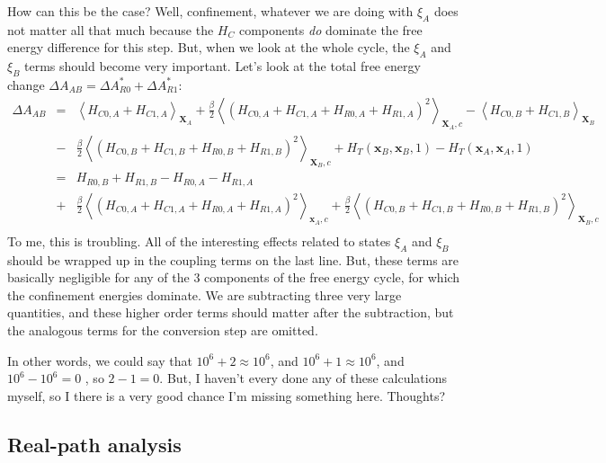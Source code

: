 \documentclass[%
 preprint,
 amsmath,amssymb,
 aps,
]{revtex4-1}
\renewcommand{\vec}[1]{{\mathbf{#1}}}
\begin{document}
 How can this be the case?  Well,  confinement, whatever we are doing with $\xi_A$ does not matter all that much because the $H_C$ components \emph{do} dominate the free energy difference for this step.  But, when we look at the whole cycle, the $\xi_A$ and $\xi_B$ terms should become very important.  Let's look at the total free energy change $\Delta A_{AB} = \Delta A^*_ {R0}+\Delta A^*_ {R1}$:
 \begin{eqnarray}
 \Delta A_{AB} &= &
 \left \langle H_{C0,A}+H_{C1,A} \right \rangle_{\vec{X}_A} +  \frac{\beta}{2}\left \langle \left( H_{C0,A}+H_{C1,A}+H_{R0,A}+H_{R1,A} \right)^2 \right \rangle_{\vec{X}_A,c}
 - \left \langle H_{C0,B}+H_{C1,B} \right \rangle_{\vec{X}_B} 
 \nonumber \\ 
 & -& \frac{\beta}{2}\left \langle \left( H_{C0,B}+H_{C1,B} + H_{R0,B}+H_{R1,B} \right)^2 \right \rangle_{\vec{X}_B,c}
 +H_T \left( \vec{x}_B,\vec{x}_B,1 \right) -  H_T \left( \vec{x}_A,\vec{x}_A,1 \right) 
 \nonumber  \\ & = & 
  H_{R0,B}+H_{R1,B}-H_{R0,A}-H_{R1,A}
   \nonumber \\
 & + & 
 \frac{\beta}{2}\left \langle \left( H_{C0,A}+H_{C1,A} +H_{R0,A}+H_{R1,A} \right)^2 \right\rangle_{\vec{x}_A,c}  +  \frac{\beta}{2}\left \langle \left( H_{C0,B}+H_{C1,B} + H_{R0,B}+H_{R1,B}  \right)^2 \right \rangle_{\vec{X}_B,c}
 \nonumber \\
 \label{e:CCRtot}
 \end{eqnarray}
 To me, this is troubling.  All of the interesting effects related to states $\xi_A$ and $\xi_B$ should be wrapped up in the coupling terms on the last line.  But, these terms are basically negligible for any of the 3 components of the free energy cycle, for which the confinement energies dominate.  We are subtracting three very large quantities, and these higher order terms should matter after the subtraction, but the analogous terms for the conversion step are omitted.  
 
 In other words, we could say that $10^6+2 \approx 10^6$, and $10^6+1 \approx 10^6$, and $10^6 - 10^6 =0$ , so $2-1=0$.  
 But, I haven't every done any of these calculations myself, so I there is a very good chance I'm missing something here.  Thoughts? 
 
 
 \subsection{Real-path analysis}
 
\end{document}
